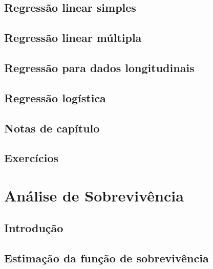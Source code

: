 \documentclass[
]{latex/krantz}
\theoremstyle{definition}
\theoremstyle{definition}
\theoremstyle{definition}
\theoremstyle{definition}
\theoremstyle{remark}
\begin{document}
\hypertarget{regressuxe3o-linear-simples}{%
\section{Regressão linear simples}\label{regressuxe3o-linear-simples}}

\hypertarget{regressuxe3o-linear-muxfaltipla}{%
\section{Regressão linear múltipla}\label{regressuxe3o-linear-muxfaltipla}}

\hypertarget{regressuxe3o-para-dados-longitudinais}{%
\section{Regressão para dados longitudinais}\label{regressuxe3o-para-dados-longitudinais}}

\hypertarget{regressuxe3o-loguxedstica}{%
\section{Regressão logística}\label{regressuxe3o-loguxedstica}}

\hypertarget{notas-de-capuxedtulo-4}{%
\section{Notas de capítulo}\label{notas-de-capuxedtulo-4}}

\hypertarget{exercuxedcios-4}{%
\section{Exercícios}\label{exercuxedcios-4}}

\hypertarget{anuxe1lise-de-sobrevivuxeancia}{%
\chapter{Análise de Sobrevivência}\label{anuxe1lise-de-sobrevivuxeancia}}

\hypertarget{introduuxe7uxe3o-5}{%
\section{Introdução}\label{introduuxe7uxe3o-5}}

\hypertarget{estimauxe7uxe3o-da-funuxe7uxe3o-de-sobrevivuxeancia}{%
\section{Estimação da função de sobrevivência}\label{estimauxe7uxe3o-da-funuxe7uxe3o-de-sobrevivuxeancia}}
\end{document}
